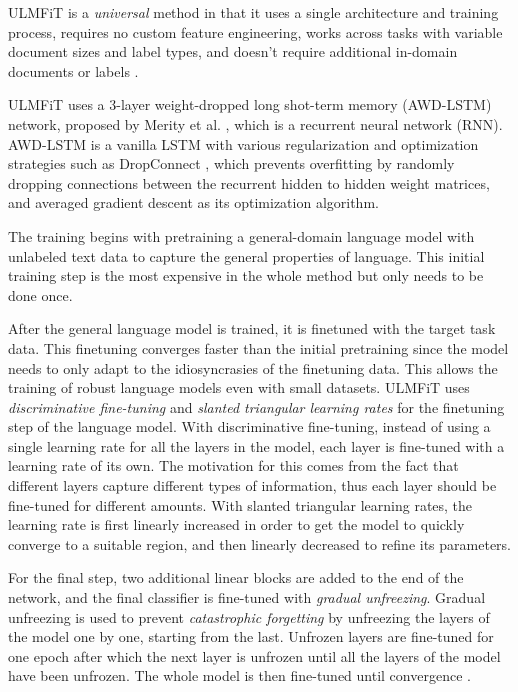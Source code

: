 ULMFiT is a \textit{universal} method in that it uses a single architecture and training process, requires no custom feature engineering, works across tasks with variable document sizes and label types, and doesn't require additional in-domain documents or labels \cite{howard2018}.

ULMFiT uses a 3-layer weight-dropped long shot-term memory (AWD-LSTM) network, proposed by Merity et al. \cite{merity2017}, which is a recurrent neural network (RNN).
AWD-LSTM is a vanilla LSTM with various regularization and optimization strategies such as DropConnect \cite{wan}, which prevents overfitting by randomly dropping connections between the recurrent hidden to hidden weight matrices, and averaged gradient descent as its optimization algorithm.

The training begins with pretraining a general-domain language model with unlabeled text data to capture the general properties of language.
This initial training step is the most expensive in the whole method but only needs to be done once.

After the general language model is trained, it is finetuned with the target task data.
This finetuning converges faster than the initial pretraining since the model needs to only adapt to the idiosyncrasies of the finetuning data.
This allows the training of robust language models even with small datasets.
ULMFiT uses \textit{discriminative fine-tuning} and \textit{slanted triangular learning rates} for the finetuning step of the language model.
With discriminative fine-tuning, instead of using a single learning rate for all the layers in the model, each layer is fine-tuned with a learning rate of its own.
The motivation for this comes from the fact that different layers capture different types of information, thus each layer should be fine-tuned for different amounts.
With slanted triangular learning rates, the learning rate is first linearly increased in order to get the model to quickly converge to a suitable region, and then linearly decreased to refine its parameters.

For the final step, two additional linear blocks are added to the end of the network, and the final classifier is fine-tuned with \textit{gradual unfreezing}.
Gradual unfreezing is used to prevent \textit{catastrophic forgetting} by unfreezing the layers of the model one by one, starting from the last.
Unfrozen layers are fine-tuned for one epoch after which the next layer is unfrozen until all the layers of the model have been unfrozen.
The whole model is then fine-tuned until convergence \cite{howard2018}.

